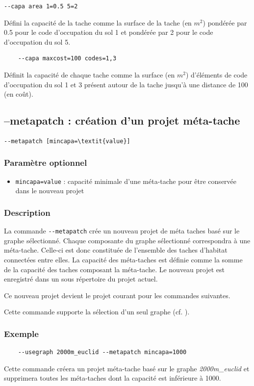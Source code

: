 \documentclass[a4paper,10pt]{report}
\begin{document}
\begin{Verbatim}
--capa area 1=0.5 5=2
\end{Verbatim}
Défini la capacité de la tache comme la surface de la tache (en $m^2$) pondérée par 0.5 pour le code d'occupation du sol 1 et pondérée par 2 pour le code d'occupation du sol 5.

\begin{Verbatim}
	--capa maxcost=100 codes=1,3
\end{Verbatim}
Définit la capacité de chaque tache comme la surface (en $m^2$) d'éléments de code d'occupation du sol 1 et 3 présent autour de la tache jusqu'à une distance de 100 (en coût). 


\subsection{--metapatch : création d'un projet méta-tache}
\begin{Verbatim}[commandchars=\\\{\}]
--metapatch [mincapa=\textit{value}]
\end{Verbatim}

\subsubsection{Paramètre optionnel}
\begin{itemize}
	\item \verb|mincapa=value| : capacité minimale d'une méta-tache pour être conservée dans le nouveau projet
\end{itemize}

\subsubsection{Description}
La commande \verb|--metapatch| crée un nouveau projet de méta taches basé sur le graphe sélectionné. 
Chaque composante du graphe sélectionné correspondra à une méta-tache. Celle-ci est donc constituée de l’ensemble des taches d’habitat connectées entre elles.
La capacité des méta-taches est définie comme la somme de la capacité des taches composant la méta-tache. Le nouveau projet est enregistré dans un sous répertoire du projet actuel.

Ce nouveau projet devient le projet courant pour les commandes suivantes.

Cette commande supporte la sélection d'un seul graphe (cf. ).

\subsubsection{Exemple}
\begin{Verbatim}
	--usegraph 2000m_euclid --metapatch mincapa=1000
\end{Verbatim}
Cette commande créera un projet méta-tache basé sur le graphe \textit{2000m\_euclid} et supprimera toutes les méta-taches dont la capacité est inférieure à 1000.
\end{document}
